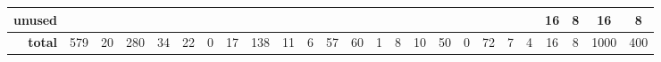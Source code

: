 \begin{table*}[!t]
\begin{adjustbox}{max width=\textwidth}
\begin{tabular}{r|cc|cc|cc|cc|cc|cc|cc|cc|cc|cc|cc|cc}
             \textbf{unused} &      &      &      &      &      &      &       &      &        &      &      &      &      &      &        &      &       &      &         &      &     16 &    8 &    16 &    8 \\ \hline
                  \textbf{total} &  579 &   20 &  280 &   34 &   22 &    0 &    17 &  138 &     11 &    6 &   57 &   60 &    1 &    8 &     10 &   50 &     0 &   72 &       7 &    4 &     16 &    8 &  1000 &  400 \\
\end{tabular}

    \end{adjustbox}
        \vspace{-10pt}
\end{table*}